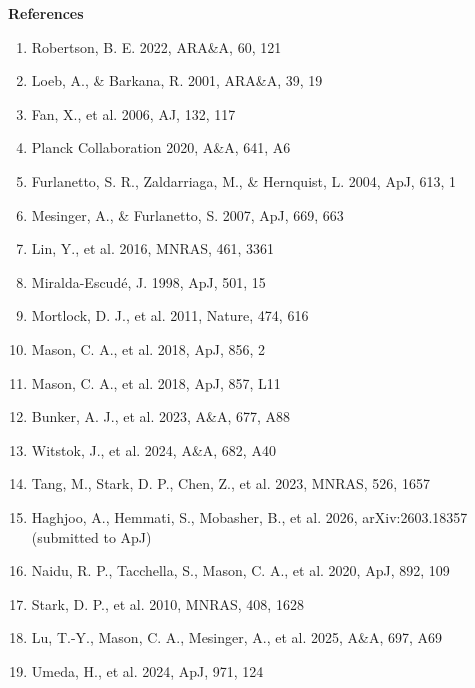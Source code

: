 \documentclass[12pt,letterpaper]{article}
\begin{document}
\clearpage
\begin{center}{\large\bfseries References}\end{center}
\begin{enumerate}\setlength\itemsep{0pt}\small
\item Robertson, B. E. 2022, ARA\&A, 60, 121
\item Loeb, A., \& Barkana, R. 2001, ARA\&A, 39, 19
\item Fan, X., et al. 2006, AJ, 132, 117
\item Planck Collaboration 2020, A\&A, 641, A6
\item Furlanetto, S. R., Zaldarriaga, M., \& Hernquist, L. 2004, ApJ, 613, 1
\item Mesinger, A., \& Furlanetto, S. 2007, ApJ, 669, 663
\item Lin, Y., et al. 2016, MNRAS, 461, 3361 %
\item Miralda-Escud\'e, J. 1998, ApJ, 501, 15
\item Mortlock, D. J., et al. 2011, Nature, 474, 616 %
\item Mason, C. A., et al. 2018, ApJ, 856, 2 %
\item Mason, C. A., et al. 2018, ApJ, 857, L11 %
\item Bunker, A. J., et al. 2023, A\&A, 677, A88 %
\item Witstok, J., et al. 2024, A\&A, 682, A40 %
\item Tang, M., Stark, D. P., Chen, Z., et al. 2023, MNRAS, 526, 1657 %
\item Haghjoo, A., Hemmati, S., Mobasher, B., et al. 2026, arXiv:2603.18357 (submitted to ApJ)
\item Naidu, R. P., Tacchella, S., Mason, C. A., et al. 2020, ApJ, 892, 109 %
\item Stark, D. P., et al. 2010, MNRAS, 408, 1628 %
\item Lu, T.-Y., Mason, C. A., Mesinger, A., et al. 2025, A\&A, 697, A69 %
\item Umeda, H., et al. 2024, ApJ, 971, 124 %

\end{enumerate}
\end{document}
